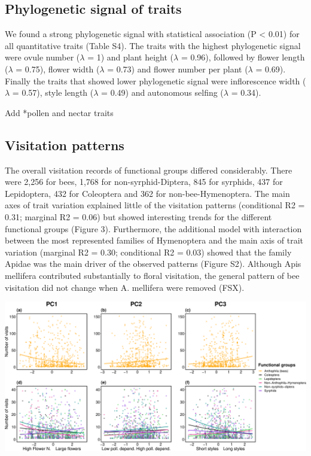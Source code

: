 \documentclass[11pt,a4paper,]{article}
\begin{document}
\subsection{Phylogenetic signal of
traits}\label{phylogenetic-signal-of-traits-1}

We found a strong phylogenetic signal with statistical association (P
\textless{} 0.01) for all quantitative traits (Table S4). The traits
with the highest phylogenetic signal were ovule number (\(\lambda\) = 1)
and plant height (\(\lambda\) = 0.96), followed by flower length
(\(\lambda\) = 0.75), flower width (\(\lambda\) = 0.73) and flower
number per plant (\(\lambda\) = 0.69). Finally the traits that showed
lower phylogenetic signal were inflorescence width (\(\lambda\) = 0.57),
style length (\(\lambda\) = 0.49) and autonomous selfing (\(\lambda\) =
0.34).

Add *pollen and nectar traits

\subsection{Visitation patterns}\label{visitation-patterns}

The overall visitation records of functional groups differed
considerably. There were 2,256 for bees, 1,768 for non-syrphid-Diptera,
845 for syrphids, 437 for Lepidoptera, 432 for Coleoptera and 362 for
non-bee-Hymenoptera. The main axes of trait variation explained little
of the visitation patterns (conditional R2 = 0.31; marginal R2 = 0.06)
but showed interesting trends for the different functional groups
(Figure 3). Furthermore, the additional model with interaction between
the most represented families of Hymenoptera and the main axis of trait
variation (marginal R2 = 0.30; conditional R2 = 0.03) showed that the
family Apidae was the main driver of the observed patterns (Figure S2).
Although Apis mellifera contributed substantially to floral visitation,
the general pattern of bee visitation did not change when A. mellifera
were removed (FSX).

\includegraphics{output/figures/unnamed-chunk-4-1.pdf}
\end{document}
